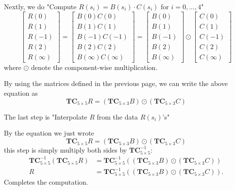 \documentclass[
11pt,notheorems,hyperref={pdfauthor=whatever}
]{beamer}
\begin{document}
\begin{frame}
    Nextly, we do "Compute $R(s_{i}) = B(s_{i}) \cdot C(s_{i})$ for $i=0,...,4$"
    \[
    \left[\begin{array}{l}
    R(0) \\
    R(1) \\
    R(-1) \\
    R(2) \\
    R(\infty)
    \end{array}\right]=\left[\begin{array}{l}
    B(0)C(0)   \\
    B(1)C(1)   \\
    B(-1)C(-1) \\
    B(2)C(2)   \\
    B(\infty)C(\infty)
    \end{array}\right]=\left[\begin{array}{l}
    B(0) \\
    B(1) \\
    B(-1) \\
    B(2) \\
    B(\infty)
    \end{array}\right] \odot\left[\begin{array}{l}
    C(0) \\
    C(1) \\
    C(-1) \\
    C(2) \\
    C(\infty)
    \end{array}\right]
    \]
    where $\odot$ denote the component-wise multiplication.

    By using the matrices defined in the previous page, we can write the above equation as
    \[
    \mathbf{TC}_{5 \times 5} R=\left(\mathbf{TC}_{5 \times 3} B\right) \odot\left(\mathbf{TC}_{5 \times 3} C\right)
    \]
\end{frame}

\begin{frame}
    The last step is "Interpolate $R$ from the data $R(s_{i})$'s"

    By the equation we just wrote
    \[
    \mathbf{TC}_{5 \times 5} R=\left(\mathbf{TC}_{5 \times 3} B\right) \odot\left(\mathbf{TC}_{5 \times 3} C\right)
    \]
    this step is simply multiply both sides by $\mathbf{TC}_{5 \times 5}^{-1}$:
    \[
    \begin{aligned}
    \mathbf{TC}_{5 \times 5}^{-1}\left(\mathbf{TC}_{5 \times 5} R\right) & =\mathbf{TC}_{5 \times 5}^{-1}\left(\left(\mathbf{TC}_{5 \times 3} B\right) \odot\left(\mathbf{TC}_{5 \times 3} C\right)\right) \\
    R & =\mathbf{TC}_{5 \times 5}^{-1}\left(\left(\mathbf{TC}_{5 \times 3} B\right) \odot\left(\mathbf{TC}_{5 \times 3} C\right)\right) .
    \end{aligned}
    \]
    Completes the computation.

\end{frame}
\end{document}
